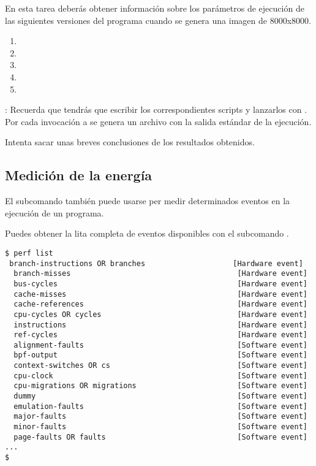 En esta tarea deberás obtener información sobre los parámetros de ejecución de
las siguientes versiones del programa cuando se genera una imagen de 8000x8000.

\begin{enumerate}
  \item {}
  \item {}
  \item {}
  \item {}
  \item {}
\end{enumerate}

: Recuerda que tendrás que escribir los correspondientes
scripts y lanzarlos con . Por cada invocación a
 se genera un archivo  con la salida
estándar de la ejecución.

Intenta sacar unas breves conclusiones de los resultados obtenidos.

\subsection{Medición de la energía}

El subcomando  también puede usarse per medir determinados eventos
en la ejecución de un programa.

Puedes obtener la lita completa de eventos disponibles con el subcomando .

\begin{lstlisting}[style=terminal]
$ perf list
 branch-instructions OR branches                    [Hardware event]
  branch-misses                                      [Hardware event]
  bus-cycles                                         [Hardware event]
  cache-misses                                       [Hardware event]
  cache-references                                   [Hardware event]
  cpu-cycles OR cycles                               [Hardware event]
  instructions                                       [Hardware event]
  ref-cycles                                         [Hardware event]
  alignment-faults                                   [Software event]
  bpf-output                                         [Software event]
  context-switches OR cs                             [Software event]
  cpu-clock                                          [Software event]
  cpu-migrations OR migrations                       [Software event]
  dummy                                              [Software event]
  emulation-faults                                   [Software event]
  major-faults                                       [Software event]
  minor-faults                                       [Software event]
  page-faults OR faults                              [Software event]
...
$
\end{lstlisting}

